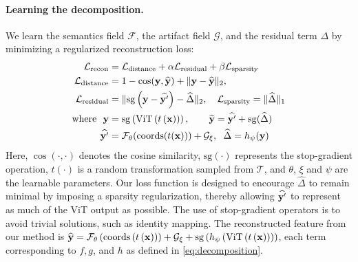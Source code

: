 \paragraph{Learning the decomposition.} We learn the semantics field $\mathcal{F}$, the artifact field $\mathcal{G}$, and the residual term $\Delta$ by minimizing a regularized reconstruction loss:
\begin{align}
    \mathcal{L}_\text{recon}      & = \mathcal{L}_{\text{distance}} + \alpha \mathcal{L}_{\text{residual}} + \beta  \mathcal{L}_{\text{sparsity}} \label{eq:recon}                             \\
    \mathcal{L}_{\text{distance}} & = 1 - \cos(\vb{y}, \widehat{\vb{y}}) + \| \vb{y} - \widehat{\vb{y}} \|_2,                                                                                  \\
    \mathcal{L}_\text{residual}   & = \|\mathrm{sg}\left(\vb{y} - \widehat{\vb{y}'}\right) - \widehat{\Delta}\|_2, \hspace{1em} \mathcal{L}_{\text{sparsity}} = \|\widehat{\Delta}\|_1         \\
    \text{where}~~\vb{y}          & = \mathrm{sg}\left(\mathrm{ViT}\left(t\left(\vb{x}\right)\right)\right), \hspace{2em} \widehat{\vb{y}} = \widehat{\vb{y}'} + \mathrm{sg}(\widehat{\Delta}) \\
    \widehat{\vb{y}'}             & = \mathcal{F}_{\theta}(\mathrm{coords}(t(\vb{x}))) + \mathcal{G}_{\xi}, \hspace{0.6em} \widehat{\Delta} = h_{\psi}(\vb{y})
\end{align}
Here, $\cos(\cdot, \cdot)$ denotes the cosine similarity, $\mathrm{sg}(\cdot)$ represents the stop-gradient operation, $t(\cdot)$ is a random transformation sampled from $\mathcal{T}$, and $\theta$, $\xi$ and $\psi$ are the learnable parameters. Our loss function is designed to encourage $\widehat{\Delta}$ to remain minimal by imposing a sparsity regularization, thereby allowing $\widehat{\vb{y}'}$ to represent as much of the ViT output as possible. The use of stop-gradient operators is to avoid trivial solutions, such as identity mapping. The reconstructed feature from our method is $\widehat{\vb{y}} = \mathcal{F}_{\theta}\left(\mathrm{coords}\left(t\left(\vb{x}\right)\right)\right) + \mathcal{G}_{\xi} + \mathrm{sg}\left(h_{\psi}\left(\mathrm{ViT}\left(t\left(\vb{x}\right)\right)\right)\right)$, each term corresponding to $f, g$, and $h$ as defined in \cref{eq:decomposition}.



